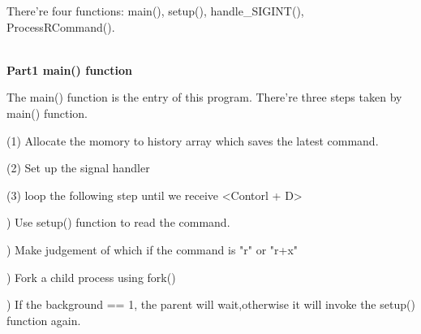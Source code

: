 \documentclass[12pt,a4paper]{article}
\begin{document}
There're four functions: main(), setup(), handle\_SIGINT(), ProcessRCommand().

~\\
 \textbf{Part1 main() function}

The main() function is the entry of this program. There're three steps taken by main() function.

(1) Allocate the momory to history array which saves the latest command.

(2) Set up the signal handler

(3) loop the following step until we receive <Contorl + D>

) Use setup() function to read the command.

) Make judgement of which if the command is "r" or "r+x" 

) Fork a child process using fork()

) If the background == 1, the parent will wait,otherwise it will invoke the setup() function again.
\end{document}
